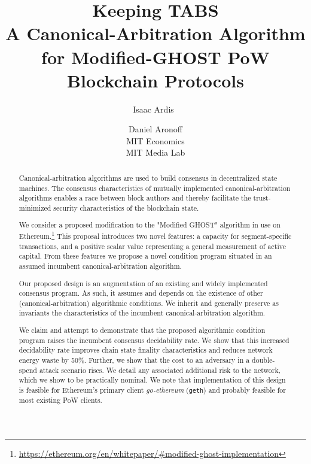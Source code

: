 \documentclass[11pt]{article}
\title{\textbf{Keeping TABS}\\
\small{A Canonical-Arbitration Algorithm for Modified-GHOST PoW Blockchain Protocols}}
\author{Isaac Ardis\
\and Daniel Aronoff\\\small{MIT Economics}\\\small{MIT Media Lab}}
\theoremstyle{plain}
\begin{document}

\maketitle
\begin{abstract}

Canonical-arbitration algorithms are used to build consensus in decentralized
state machines.
The consensus characteristics of mutually implemented canonical-arbitration
algorithms enables a race between block authors and thereby facilitate
the trust-minimized security characteristics of the blockchain state.

We consider a proposed modification to the "Modified GHOST" algorithm in use on
Ethereum.\footnote{\url{https://ethereum.org/en/whitepaper/#modified-ghost-implementation}}
This proposal introduces two novel features: a capacity for segment-specific
transactions, and a positive scalar value representing a general measurement of
active capital.
From these features we propose a novel condition program situated in an assumed
incumbent canonical-arbitration algorithm.

Our proposed design is an augmentation of an existing and widely implemented consensus program.
As such, it assumes and depends on the existence of other (canonical-arbitration)
algorithmic conditions.
We inherit and generally preserve as invariants the characteristics of the incumbent canonical-arbitration algorithm.

We claim and attempt to demonstrate that the proposed algorithmic condition
program raises the incumbent consensus decidability rate.
We show that this increased decidability rate improves chain state finality
characteristics and reduces network energy waste by 50\%.
Further, we show that the cost to an adversary in a double-spend attack scenario rises.
We detail any associated additional risk to the network, which we show to
be practically nominal.
We note that implementation of this design is feasible for Ethereum's
primary client \textit{go-ethereum} (\texttt{geth}) and probably feasible for
most existing PoW clients.

\end{abstract}

\pagebreak
\end{document}
